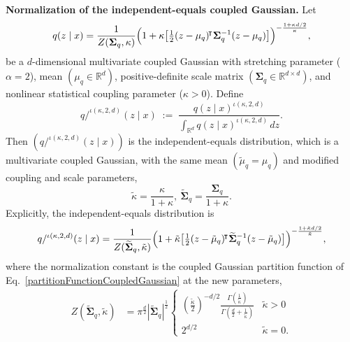 \documentclass[twoside,11pt]{article}
\begin{document}
\begin{lemma}\label{Normalization} \textbf{Normalization of the independent-equals coupled Gaussian.} Let
\[
q(z \mid x) = \frac{1}{Z(\boldsymbol{\Sigma}_q, \kappa)}
\Bigl(1 + \kappa \bigl[\tfrac{1}{2}(z-\mu_q)^{\!\intercal} \boldsymbol{\Sigma}_q^{-1} (z-\mu_q)\bigr]\Bigr)^{-\frac{1 + \kappa d/2}{\kappa}}, 
\]
be a $d$-dimensional multivariate coupled Gaussian with stretching parameter ($\alpha=2$), mean $(\mu_q \in \mathbb{R}^d)$, positive-definite scale matrix $(\boldsymbol{\Sigma}_q \in \mathbb{R}^{d \times d})$, and nonlinear statistical coupling parameter ($\kappa > 0$).
Define  
\[
q/^{\iota(\kappa,2,d)}(z \mid x) \;:=\; \frac{q(z \mid x)^{\iota(\kappa,2,d)}}
{\int_{\mathbb{R}^d} q(z \mid x)^{\iota(\kappa,2,d)} \, dz}.
\]
Then $(q/^{\iota(\kappa,2,d)}(z \mid x))$ is the independent-equals distribution, which is a multivariate coupled Gaussian, with the same mean $(\tilde\mu_q = \mu_q)$ and modified coupling and scale parameters,  
\[
\tilde\kappa= \frac{\kappa}{1+\kappa}, \ 
\widetilde{\boldsymbol{\Sigma}}_q =  \frac{\boldsymbol{\Sigma}_q}{1+\kappa}.
\]
Explicitly,  the independent-equals distribution is
\[
q/^{\iota(\kappa,2,d)}(z \mid x) = \frac{1}{Z(\widetilde{\boldsymbol{\Sigma}}_q, \tilde\kappa)}
\Bigl(1 + \tilde\kappa \bigl[\tfrac{1}{2}(z-\tilde\mu_q)^{\!\intercal} \widetilde{\boldsymbol{\Sigma}}_q^{-1} (z-\tilde\mu_q)\bigr]\Bigr)^{-\frac{1 + \tilde\kappa d/2}{\tilde\kappa}},
\]
where the normalization constant is the coupled Gaussian partition function of Eq.~\eqref{partitionFunctionCoupledGaussian} at the new parameters,
\begin{align}
    Z(\widetilde{\boldsymbol{\Sigma}}_q, \tilde\kappa)  
    &=\pi^\frac{d}{2}
|\widetilde{\boldsymbol{\Sigma}}_q|^\frac{1}{2}
\left\{
\begin{matrix}
    \left(\frac{\tilde{\kappa}}{2}\right)^{-d/2}
    \frac{\Gamma(\frac{1}{\tilde{\kappa}})}{\Gamma(\frac{d}{2}+\frac{1}{\tilde{\kappa}})}
    & \tilde\kappa > 0 \\
    2^{d/2} & \tilde\kappa=0.
\end{matrix}
\right.
\end{align}
\end{lemma}
\end{document}
